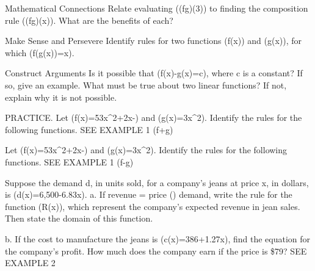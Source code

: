 \documentclass{article}
\newenvironment{practice}[2]{}{}        %
\newcommand{\answer}[1]{}               %
\newcommand{\te}[1]{}                   %
\begin{document}
\begin{practice}{17}{2}
Mathematical Connections Relate evaluating ((f\circ g)(3)) to finding the composition rule ((f\circ g)(x)). What are the benefits of each?
\answer{Evaluating function composition for a specific value is finding (g(3)) and then substituting (g(3)) for x in (f(x)). This approach is good when you only want to find a few values. Finding the rule of ((f\circ g)(x)) is similar in that you evaluate (f(x)) for the rule (g(x)), that is (f(g(x))). You can then recognize key features of the new function, including domain, range, and end behavior.}
\te{Answer printed on PDF page 73.}
\end{practice}
\begin{practice}{18}{2}
Make Sense and Persevere Identify rules for two functions (f(x)) and (g(x)), for which (f(g(x))=x).
\answer{Sample answer: If (f(x)=\frac12x) and (g(x)=2x), then (f(g(x))=x).}
\te{Answer printed on PDF page 73.}
\end{practice}
\begin{practice}{19}{2}
Construct Arguments Is it possible that (f(x)-g(x)=c), where c is a constant? If so, give an example. What must be true about two linear functions? If not, explain why it is not possible.
\answer{It is possible; Sample: If the graphs of the two linear functions are parallel, then their difference will be a horizontal line; (f(x)=3x-4) and (g(x)=3x+2), so (f(x)-g(x)=-6), which represents a horizontal line.}
\end{practice}
\begin{practice}{20}{1}
PRACTICE. Let (f(x)=\frac53x^2+2x-) and (g(x)=3x^2). Identify the rules for the following functions. SEE EXAMPLE 1
(f+g)
\answer{(f+g=\frac{14}3x^2+2x-\frac58)}
\end{practice}
\begin{practice}{21}{1}
Let (f(x)=\frac53x^2+2x-) and (g(x)=3x^2). Identify the rules for the following functions. SEE EXAMPLE 1
(f-g)
\answer{(f-g=-\frac43x^2+2x-\frac58)}
\end{practice}
\begin{practice}{22}{2}
Suppose the demand d, in units sold, for a company's jeans at price x, in dollars, is (d(x)=6,500-6.83x).
a. If revenue = price (\times) demand, write the rule for the function (R(x)), which represent the company's expected revenue in jean sales. Then state the domain of this function.
\answer{(R(x)=6,500x-6.83x^2) for (0\leq x\leq951.68)}
b. If the cost to manufacture the jeans is (c(x)=386+1.27x), find the equation for the company's profit. How much does the company earn if the price is \$79?
SEE EXAMPLE 2
\answer{b. (P(x)=-6.83x^2+6,498.73x-386); (P(79)=\$470,387.64)}
\te{Part b answer printed on PDF page 73. Domain endpoint in part a is rounded.}
\end{practice}
\end{document}
